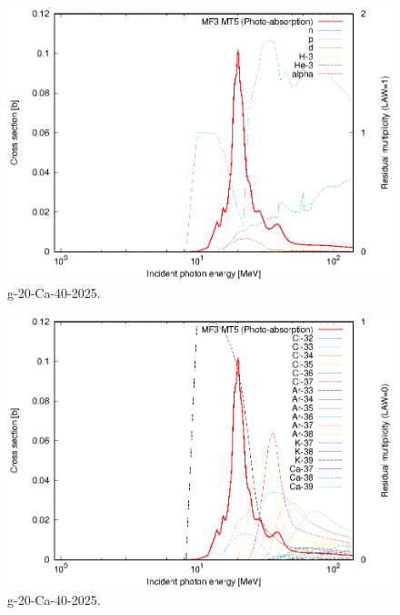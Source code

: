\begin{figure}
 \includegraphics[width=\linewidth]{eps/g_20-Ca-40_2025.eps}
  \caption{g-20-Ca-40-2025.}
\end{figure}
\begin{figure}
 \includegraphics[width=\linewidth]{eps-law0/g_20-Ca-40_2025.eps}
 \caption{g-20-Ca-40-2025.}
\end{figure}
\newpage \clearpage


